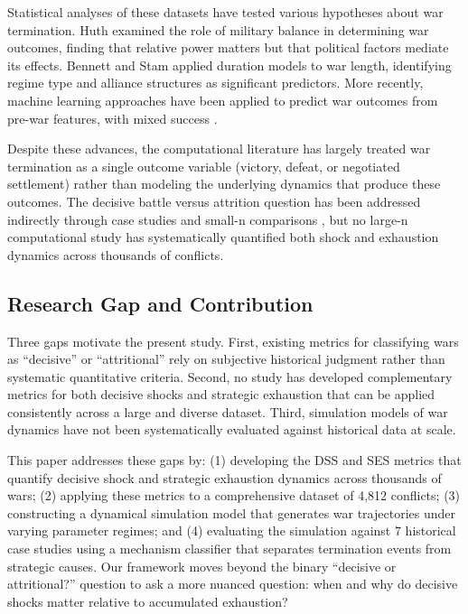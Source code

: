 Statistical analyses of these datasets have tested various hypotheses about war termination. Huth \citep{huth1996} examined the role of military balance in determining war outcomes, finding that relative power matters but that political factors mediate its effects. Bennett and Stam \citep{bennett2000} applied duration models to war length, identifying regime type and alliance structures as significant predictors. More recently, machine learning approaches have been applied to predict war outcomes from pre-war features, with mixed success \citep{ward2010}.

Despite these advances, the computational literature has largely treated war termination as a single outcome variable (victory, defeat, or negotiated settlement) rather than modeling the underlying dynamics that produce these outcomes. The decisive battle versus attrition question has been addressed indirectly through case studies and small-n comparisons \citep{reed2003}, but no large-n computational study has systematically quantified both shock and exhaustion dynamics across thousands of conflicts.

\subsection{Research Gap and Contribution}

Three gaps motivate the present study. First, existing metrics for classifying wars as ``decisive'' or ``attritional'' rely on subjective historical judgment rather than systematic quantitative criteria. Second, no study has developed complementary metrics for both decisive shocks and strategic exhaustion that can be applied consistently across a large and diverse dataset. Third, simulation models of war dynamics have not been systematically evaluated against historical data at scale.

This paper addresses these gaps by: (1) developing the DSS and SES metrics that quantify decisive shock and strategic exhaustion dynamics across thousands of wars; (2) applying these metrics to a comprehensive dataset of 4,812 conflicts; (3) constructing a dynamical simulation model that generates war trajectories under varying parameter regimes; and (4) evaluating the simulation against 7 historical case studies using a mechanism classifier that separates termination events from strategic causes. Our framework moves beyond the binary ``decisive or attritional?'' question to ask a more nuanced question: when and why do decisive shocks matter relative to accumulated exhaustion?
